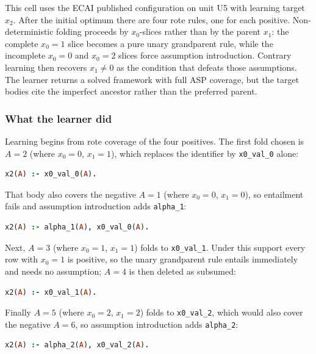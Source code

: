 \documentclass[11pt]{article}
\begin{document}
This cell uses the ECAI published configuration on unit U5 with learning target \(x_2\). After the initial optimum there are four rote rules, one for each positive. Non-deterministic folding proceeds by \(x_0\)-slices rather than by the parent \(x_1\): the complete \(x_0=1\) slice becomes a pure unary grandparent rule, while the incomplete \(x_0=0\) and \(x_0=2\) slices force assumption introduction. Contrary learning then recovers \(x_1\neq 0\) as the condition that defeats those assumptions. The learner returns a solved framework with full ASP coverage, but the target bodies cite the imperfect ancestor rather than the preferred parent.

\subsubsection{What the learner did}

Learning begins from rote coverage of the four positives. The first fold chosen is \(A=2\) (where \(x_0=0\), \(x_1=1\)), which replaces the identifier by \texttt{x0\_val\_0} alone:

\begin{lstlisting}[style=logic,language=Prolog]
x2(A) :- x0_val_0(A).
\end{lstlisting}

That body also covers the negative \(A=1\) (where \(x_0=0\), \(x_1=0\)), so entailment fails and assumption introduction adds \texttt{alpha\_1}:

\begin{lstlisting}[style=logic,language=Prolog]
x2(A) :- alpha_1(A), x0_val_0(A).
\end{lstlisting}

Next, \(A=3\) (where \(x_0=1\), \(x_1=1\)) folds to \texttt{x0\_val\_1}. Under this support every row with \(x_0=1\) is positive, so the unary grandparent rule entails immediately and needs no assumption; \(A=4\) is then deleted as subsumed:

\begin{lstlisting}[style=logic,language=Prolog]
x2(A) :- x0_val_1(A).
\end{lstlisting}

Finally \(A=5\) (where \(x_0=2\), \(x_1=2\)) folds to \texttt{x0\_val\_2}, which would also cover the negative \(A=6\), so assumption introduction adds \texttt{alpha\_2}:

\begin{lstlisting}[style=logic,language=Prolog]
x2(A) :- alpha_2(A), x0_val_2(A).
\end{lstlisting}
\end{document}

